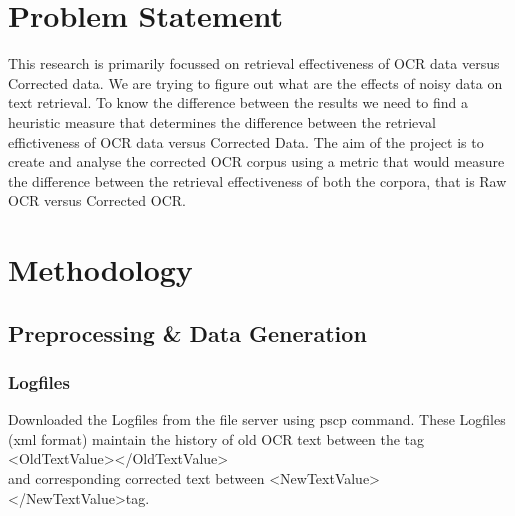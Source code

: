 \section{Problem Statement}
This research is primarily focussed on retrieval effectiveness of OCR data versus Corrected data. We are trying to figure out what are the effects of noisy data on text retrieval. To know the difference between the results we need to find a heuristic measure that determines the difference between the retrieval effictiveness of OCR data versus Corrected Data. The aim of the project is to create and analyse the corrected OCR corpus using a metric that would measure the difference between the retrieval effectiveness of both the corpora, that is Raw OCR versus Corrected OCR.

\section{Methodology}
\subsection{Preprocessing \& Data Generation}
\subsubsection{Logfiles} Downloaded the Logfiles from the file server using pscp command. These Logfiles (xml format) maintain the history of old OCR text between the tag \textless OldTextValue\textgreater \textless/OldTextValue\textgreater \\ 
 and corresponding corrected text between \textless NewTextValue\textgreater \textless/NewTextValue\textgreater \space tag. \\

